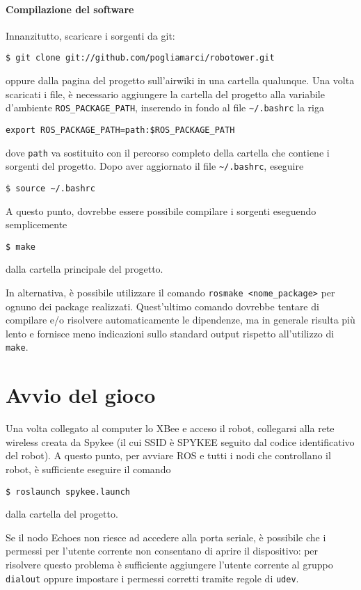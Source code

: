 \paragraph{Compilazione del software} Innanzitutto, scaricare i sorgenti da git:
\begin{verbatim}
$ git clone git://github.com/pogliamarci/robotower.git
\end{verbatim}
oppure dalla pagina del progetto sull'airwiki in una cartella qualunque. Una volta scaricati i file, è necessario aggiungere la cartella del progetto alla variabile d'ambiente \verb|ROS_PACKAGE_PATH|, inserendo in fondo al file \verb|~/.bashrc| la riga
\begin{verbatim}
export ROS_PACKAGE_PATH=path:$ROS_PACKAGE_PATH
\end{verbatim}
dove \verb|path| va sostituito con il percorso completo della cartella che contiene i sorgenti del progetto. Dopo aver aggiornato il file \verb|~/.bashrc|, eseguire
\begin{verbatim}
$ source ~/.bashrc
\end{verbatim}
A questo punto, dovrebbe essere possibile compilare i sorgenti eseguendo semplicemente
\begin{verbatim}
$ make
\end{verbatim}
dalla cartella principale del progetto.

\begin{nota}
In alternativa, è possibile utilizzare il comando \verb|rosmake <nome_package>| per ognuno dei package realizzati. Quest'ultimo comando dovrebbe tentare di compilare e/o risolvere automaticamente le dipendenze, ma in generale risulta più lento e fornisce meno indicazioni sullo standard output rispetto all'utilizzo di \verb|make|.
\end{nota}

\section{Avvio del gioco} Una volta collegato al computer lo XBee e acceso il robot, collegarsi alla rete wireless creata da Spykee (il cui SSID è SPYKEE seguito dal codice identificativo del robot). A questo punto, per avviare ROS e tutti i nodi che controllano il robot, è sufficiente eseguire il comando
\begin{verbatim}
$ roslaunch spykee.launch
\end{verbatim}
dalla cartella del progetto.

\begin{nota}
Se il nodo Echoes non riesce ad accedere alla porta seriale, è possibile che i permessi per l'utente corrente non consentano di aprire il dispositivo: per risolvere questo problema è sufficiente aggiungere l'utente corrente al gruppo \verb|dialout| oppure impostare i permessi corretti tramite regole di \verb|udev|.
\end{nota}

